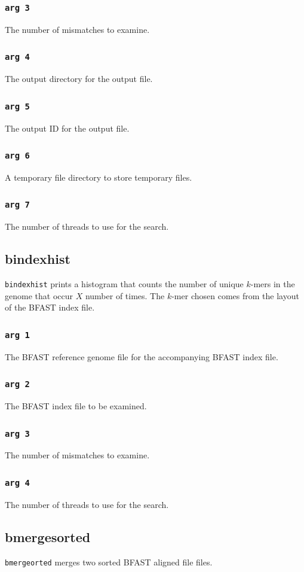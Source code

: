 \documentclass[a4paper,12pt]{book}
\newcommand{\TT}[1]{{\tt #1}} %
\newcommand{\BRGF}{BFAST reference genome file} %
\newcommand{\BIF}{BFAST index file} %
\newcommand{\BAF}{BFAST aligned file} %
\begin{document}
\subsubsection{\TT{arg 3}}
The number of mismatches to examine.
\subsubsection{\TT{arg 4}}
The output directory for the output file.
\subsubsection{\TT{arg 5}}
The output ID for the output file.
\subsubsection{\TT{arg 6}}
A temporary file directory to store temporary files.
\subsubsection{\TT{arg 7}}
The number of threads to use for the search.

\subsection{bindexhist}
\label{sec:bindexhist}
\TT{bindexhist} prints a histogram that counts the number of unique $k$-mers in the genome that occur $X$ number of
times.  
The $k$-mer chosen comes from the layout of the \BIF{}.

\subsubsection{\TT{arg 1}}
The \BRGF{} for the accompanying \BIF{}.
\subsubsection{\TT{arg 2}}
The \BIF{} to be examined.
\subsubsection{\TT{arg 3}}
The number of mismatches to examine.
\subsubsection{\TT{arg 4}}
The number of threads to use for the search.
\subsection{bmergesorted}
\TT{bmergeorted} merges two sorted \BAF{} files.
\end{document}
